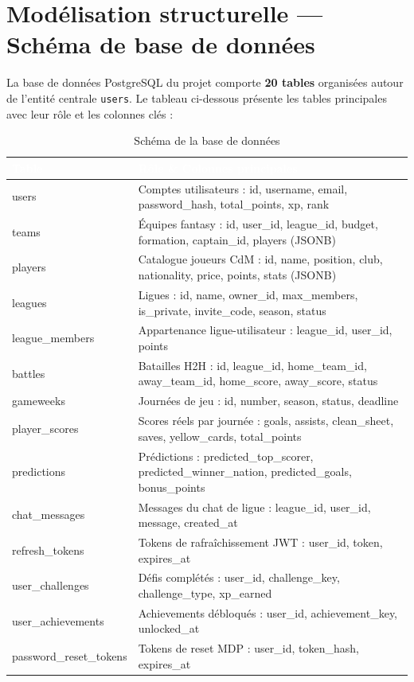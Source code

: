 \section{Modélisation structurelle --- Schéma de base de données}

La base de données PostgreSQL du projet comporte \textbf{20 tables} organisées autour de l'entité centrale \texttt{users}. Le tableau ci-dessous présente les tables principales avec leur rôle et les colonnes clés :

\vspace{0.3cm}

\begin{table}[!htbp]
\centering
    \begin{tabularx}{\linewidth}{|l|X|}
        \hline
        \rowcolor{emsigreen}\textcolor{white}{\textbf{Table}} & \textcolor{white}{\textbf{Rôle \& Colonnes principales}} \\
        \hline
        users & Comptes utilisateurs : id, username, email, password\_hash, total\_points, xp, rank \\
        \hline
        teams & Équipes fantasy : id, user\_id, league\_id, budget, formation, captain\_id, players (JSONB) \\
        \hline
        players & Catalogue joueurs CdM : id, name, position, club, nationality, price, points, stats (JSONB) \\
        \hline
        leagues & Ligues : id, name, owner\_id, max\_members, is\_private, invite\_code, season, status \\
        \hline
        league\_members & Appartenance ligue-utilisateur : league\_id, user\_id, points \\
        \hline
        battles & Batailles H2H : id, league\_id, home\_team\_id, away\_team\_id, home\_score, away\_score, status \\
        \hline
        gameweeks & Journées de jeu : id, number, season, status, deadline \\
        \hline
        player\_scores & Scores réels par journée : goals, assists, clean\_sheet, saves, yellow\_cards, total\_points \\
        \hline
        predictions & Prédictions : predicted\_top\_scorer, predicted\_winner\_nation, predicted\_goals, bonus\_points \\
        \hline
        chat\_messages & Messages du chat de ligue : league\_id, user\_id, message, created\_at \\
        \hline
        refresh\_tokens & Tokens de rafraîchissement JWT : user\_id, token, expires\_at \\
        \hline
        user\_challenges & Défis complétés : user\_id, challenge\_key, challenge\_type, xp\_earned \\
        \hline
        user\_achievements & Achievements débloqués : user\_id, achievement\_key, unlocked\_at \\
        \hline
        password\_reset\_tokens & Tokens de reset MDP : user\_id, token\_hash, expires\_at \\
        \hline
    \end{tabularx}
\caption{Schéma de la base de données}
\end{table}

